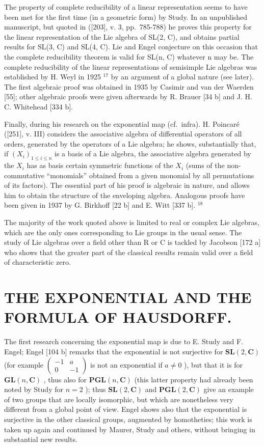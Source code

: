 The property of complete reducibility of a linear representation seems to have been met for the first time (in a geometric form) by Study. In an unpublished manuscript, but quoted in ({[}203{]}, v. 3, pp.~785-788) he proves this property for the linear representation of the Lie algebra of SL(2, C), and obtains partial results for SL(3, C) and SL(4, C). Lie and Engel conjecture on this occasion that the complete reducibility theorem is valid for SL(n, C) whatever n may be. The complete reducibility of the linear representations of semisimple Lie algebras was established by H. Weyl in 1925 \(^{17}\) by an argument of a global nature (see later). The first algebraic proof was obtained in 1935 by Casimir and van der Waerden {[}55{]}; other algebraic proofs were given afterwards by R. Brauer {[}34 b{]} and J. H. C. Whitehead {[}334 b{]}.

Finally, during his research on the exponential map (cf.~infra). H. Poincaré ({[}251{]}, v. III) considers the associative algebra of differential operators of all orders, generated by the operators of a Lie algebra; he shows, substantially that, if \((X_{i})_{1\leq i\leq n}\) is a basis of a Lie algebra, the associative algebra generated by the \(X_{i}\) has as basis certain symmetric functions of the \(X_{i}\) (sums of the non-commutative ``monomials'' obtained from a given monomial by all permutations of its factors). The essential part of his proof is algebraic in nature, and allows him to obtain the structure of the enveloping algebra. Analogous proofs have been given in 1937 by G. Birkhoff {[}22 b{]} and E. Witt {[}337 b{]}. \(^{18}\)

The majority of the work quoted above is limited to real or complex Lie algebras, which are the only ones corresponding to Lie groups in the usual sense. The study of Lie algebras over a field other than R or C is tackled by Jacobson {[}172 a{]} who shows that the greater part of the classical results remain valid over a field of characteristic zero.

\section{THE EXPONENTIAL AND THE FORMULA OF HAUSDORFF.}

The first research concerning the exponential map is due to E. Study and F. Engel; Engel {[}104 b{]} remarks that the exponential is not surjective for \(\mathbf{SL}(2, \mathbf{C})\) (for example \(\left( \begin{array}{cc} -1 & a \\ 0 & -1 \end{array} \right)\) is not an exponential if \(a \neq 0\) ), but that it is for \(\mathbf{GL}(n, \mathbf{C})\) , thus also for \(\mathbf{PGL}(n, \mathbf{C})\) (this latter property had already been noted by Study for \(n = 2\) ); thus \(\mathbf{SL}(2, \mathbf{C})\) and \(\mathbf{PGL}(2, \mathbf{C})\) give an example of two groups that are locally isomorphic, but which are nonetheless very different from a global point of view. Engel shows also that the exponential is surjective in the other classical groups, augmented by homotheties; this work is taken up again and continued by Maurer, Study and others, without bringing in substantial new results.

